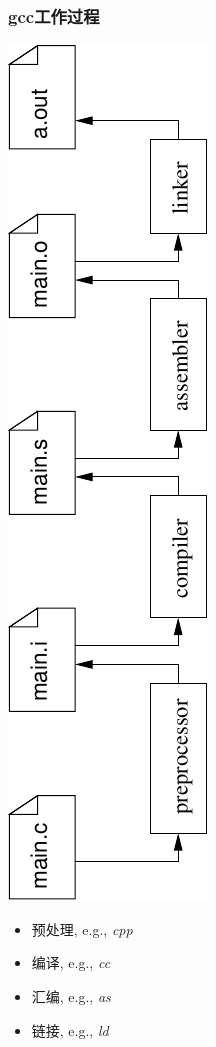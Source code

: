 \documentclass[compress]{beamer}
\begin{document}
\begin{frame}
\frametitle{gcc工作过程}

\includegraphics[angle=-90,width=1.0\hsize]{gcc_process.pdf}\\

\begin{itemize}
\item 预处理, e.g., \emph{cpp}
\item 编译, e.g., \emph{cc}
\item 汇编, e.g., \emph{as}
\item 链接, e.g., \emph{ld}
\end{itemize}

\end{frame}
\end{document}
